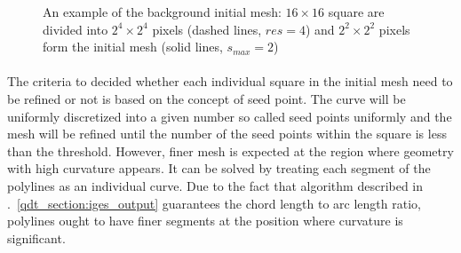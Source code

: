 \begin{figure}[h!]
    \centering
    \caption[Initial background mesh]{An example of the background initial mesh: $16 \times 16$ square are divided into $2^4 \times 2^4$ pixels (dashed lines, $res=4$) and $2^2 \times 2^2$ pixels form the initial mesh (solid lines, $s_{max}=2$)}
    \label{qdt_fig:qdt_initial_mesh}
\end{figure}

\paragraph{}
The criteria to decided whether each individual square in the initial mesh need to be refined or not is based on the concept of seed point.
The curve will be uniformly discretized into a given number so called seed points uniformly and the mesh will be refined until the number of the seed points within the square is less than the threshold.
However, finer mesh is expected at the region where geometry with high curvature appears.
It can be solved by treating each segment of the polylines as an individual curve.
Due to the fact that algorithm described in .~\ref{qdt_section:iges_output} guarantees the chord length to arc length ratio, polylines ought to have finer segments at the position where curvature is significant.

